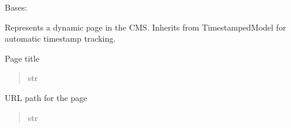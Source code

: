 \documentclass[letterpaper,10pt,english]{sphinxmanual}
\begin{document}

\begin{fulllineitems}
\label{\detokenize{pages_app.models:pages_app.models.Page}}
\pysigstartsignatures
\pysiglinewithargsret
{}
{\sphinxparamcomma {}}
{}
\pysigstopsignatures
\sphinxAtStartPar
Bases: {\hyperref[\detokenize{pages_app.models:pages_app.models.base.TimestampedModel}]{}}

\sphinxAtStartPar
Represents a dynamic page in the CMS.
Inherits from TimestampedModel for automatic timestamp tracking.

\begin{fulllineitems}
\label{\detokenize{pages_app.models:pages_app.models.Page.title}}
\pysigstartsignatures
\pysigline
{}
\pysigstopsignatures
\sphinxAtStartPar
Page title
\begin{quote}\begin{description}
\sphinxAtStartPar
str

\end{description}\end{quote}

\end{fulllineitems}


\begin{fulllineitems}
\label{\detokenize{pages_app.models:pages_app.models.Page.url_path}}
\pysigstartsignatures
\pysigline
{}
\pysigstopsignatures
\sphinxAtStartPar
URL path for the page
\begin{quote}\begin{description}
\sphinxAtStartPar
str

\end{description}\end{quote}

\end{fulllineitems}


\end{fulllineitems}
\end{document}
